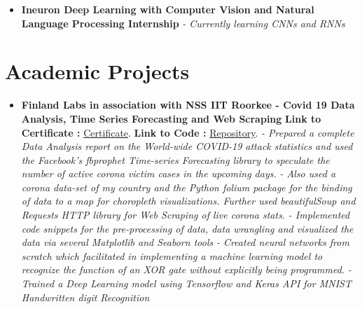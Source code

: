 \documentclass[a4paper,12pt]{article}
\begin{document}
\begin{itemize}
    \item{\textbf{\large{Ineuron Deep Learning with Computer Vision and Natural Language Processing Internship}}
          \newline
          \textit{- Currently learning CNNs and RNNs }}
\end{itemize}


\section*{Academic Projects}
\begin{itemize}
    \item{\textbf{\large{Finland Labs in association with NSS IIT Roorkee - Covid 19 Data Analysis, Time Series Forecasting and Web Scraping}}
          \newline
          \textbf{Link to Certificate :} \href{https://github.com/teetangh/Kaustav-All-Certifications/blob/master/Artificial%20Intelligence/Finland%20Labs%20and%20IITR/Covid%2019%20Analysis%20-%20AI%20and%20ML.pdf}{Certificate}.
              \textbf{ Link to Code :} \href{https://github.com/teetangh/FinlandLabs-IITR-COVID-19-Analysis}{Repository}.
              \newline
              \textit{- Prepared a complete Data Analysis report on the World-wide COVID-19 attack statistics and used the Facebook's fbprophet Time-series Forecasting library to speculate the number of active corona victim cases in the upcoming days.}
              \newline
              \textit{- Also used a corona data-set of my country and the Python folium package for the binding of data to a map for choropleth visualizations. Further used beautifulSoup and Requests HTTP library for Web Scraping of live corona stats.}
              \newline
              \textit{- Implemented code snippets for the pre-processing of data, data wrangling and visualized the data via several Matplotlib and Seaborn tools }
              \newline
              \textit{- Created neural networks from scratch which facilitated in implementing a machine learning model to recognize the function of an XOR gate without explicitly being programmed.}
              \newline
              \textit{- Trained a Deep Learning model using Tensorflow and Keras API for MNIST Handwritten digit Recognition}}


\end{itemize}
\end{document}
